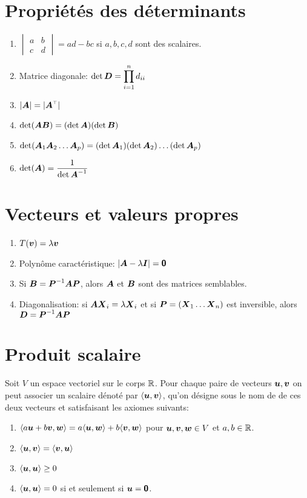 \begin{adjmulticols}{1}{0in}{-2in}
\section{Propriétés des déterminants}

\begin{enumerate}
\item $\displaystyle \begin{vmatrix} a & b \\ c & d \end{vmatrix} = ad - bc$  
si $a, b, c, d$ sont des scalaires.
\item Matrice diagonale: $\displaystyle \det \boldsymbol{D} = \prod_{i=1}^n d_{ii}$
\item $|\matA| = |\transp{\matA}|$
\item $\det(\boldsymbol{A}\boldsymbol{B}) = (\det\boldsymbol{A}) (\det\boldsymbol{B})$
\item $\det(\boldsymbol{A}_1 \boldsymbol{A}_2 \ldots \boldsymbol{A}_p) = (\det\boldsymbol{A}_1)(\det\boldsymbol{A}_2)\ldots(\det\boldsymbol{A}_p)$
\item $ \det(\boldsymbol{A}) = \displaystyle\frac{1}{\det\boldsymbol{A}^{-1}} $
\end{enumerate}

\section{Vecteurs et valeurs propres}

\begin{enumerate}
\item $T(\boldsymbol{v}) = \lambda\boldsymbol{v}$
\item Polynôme caractéristique: $|\boldsymbol{A} - \lambda\boldsymbol{I}| = \mbox{\textsf{\textbf{{0}}}}$
\item Si $\boldsymbol{B} = \boldsymbol{P}^{-1} \boldsymbol{A} \boldsymbol{P}$, alors $\boldsymbol{A}$ et $\boldsymbol{B}$ sont des matrices semblables.
\item Diagonalisation: si $\boldsymbol{A}\boldsymbol{X}_i = \lambda\boldsymbol{X}_i$ et si 
$\boldsymbol{P} = (\boldsymbol{X}_1 \ldots\boldsymbol{X}_n)$ est inversible, alors $\boldsymbol{D} = \boldsymbol{P}^{-1} \boldsymbol{A} \boldsymbol{P}$
\end{enumerate}

\section{Produit scalaire}

Soit $V$ un espace vectoriel sur le corps $\mathbb{R}$. 
Pour chaque paire de vecteurs $\boldsymbol{u}, \boldsymbol{v}$ 
on peut associer un scalaire dénoté par 
$\langle\boldsymbol{u}, \boldsymbol{v}\rangle $,
qu'on désigne sous le nom de  de ces deux vecteurs et 
satisfaisant les axiomes suivants:
\begin{enumerate}
\item $\langle a\boldsymbol{u} + b\boldsymbol{v}, \boldsymbol{w} \rangle = a \langle\boldsymbol{u}, \boldsymbol{w}\rangle + b\langle\boldsymbol{v}, \boldsymbol{w}\rangle $ pour 
$\boldsymbol{u}, \boldsymbol{v}, \boldsymbol{w} \in V$ et $a, b \in \mathbb{R}$.
\item$ \langle\boldsymbol{u}, \boldsymbol{v}\rangle = \langle\boldsymbol{v}, \boldsymbol{u}\rangle$
\item $\langle \boldsymbol{u}, \boldsymbol{u}\rangle \geq 0$
\item $\langle \boldsymbol{u}, \boldsymbol{u}\rangle = 0$ si et seulement si $\boldsymbol{u} = \mbox{\textsf{\textbf{{0}}}}$.



\end{enumerate}
\end{adjmulticols}
